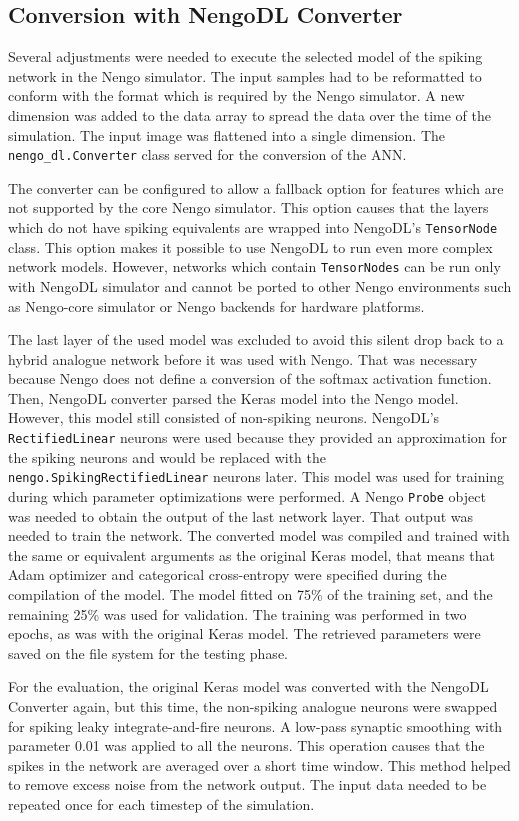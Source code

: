 \subsection{Conversion with NengoDL Converter}
Several adjustments were needed to execute the selected model of the spiking network in the Nengo simulator. The input samples had to be reformatted to conform with the format which is required by the Nengo simulator. A new dimension was added to the data array to spread the data over the time of the simulation. The input image was flattened into a single dimension. The \texttt{nengo\_dl.Converter} class served for the conversion of the ANN. \par
The converter can be configured to allow a fallback option for features which are not supported by the core Nengo simulator. This option causes that the layers which do not have spiking equivalents are wrapped into NengoDL's \texttt{TensorNode} class. This option makes it possible to use NengoDL to run even more complex network models. However, networks which contain \texttt{TensorNodes} can be run only with NengoDL simulator and cannot be ported to other Nengo environments such as Nengo-core simulator or Nengo backends for hardware platforms. \par
The last layer of the used model was excluded to avoid this silent drop back to a hybrid analogue network before it was used with Nengo. That was necessary because Nengo does not define a conversion of the softmax activation function. Then, NengoDL converter parsed the Keras model into the Nengo model. However, this model still consisted of non-spiking neurons. NengoDL's \texttt{RectifiedLinear} neurons were used because they provided an approximation for the spiking neurons and would be replaced with the \texttt{nengo.SpikingRectifiedLinear} neurons later. This model was used for training during which parameter optimizations were performed. A Nengo \texttt{Probe} object was needed to obtain the output of the last network layer. That output was needed to train the network. The converted model was compiled and trained with the same or equivalent arguments as the original Keras model, that means that Adam optimizer and categorical cross-entropy were specified during the compilation of the model. The model fitted on 75\% of the training set, and the remaining 25\% was used for validation. The training was performed in two epochs, as was with the original Keras model. The retrieved parameters were saved on the file system for the testing phase. \par
For the evaluation, the original Keras model was converted with the NengoDL Converter again, but this time, the non-spiking analogue neurons were swapped for spiking leaky integrate-and-fire neurons. A low-pass synaptic smoothing with parameter 0.01 was applied to all the neurons. This operation causes that the spikes in the network are averaged over a short time window. This method helped to remove excess noise from the network output. The input data needed to be repeated once for each timestep of the simulation. \par
